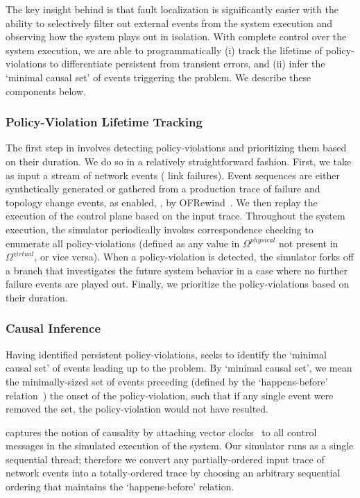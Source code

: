 The key insight behind
\simulator{} is that fault localization is significantly easier with the
ability to selectively filter
out external events from the system execution and observing how the system
plays out in isolation. 
With complete control over the
system execution, we are able to programmatically (i) track the lifetime of
policy-violations to differentiate persistent from transient errors, and (ii)
infer the `minimal causal set' of events triggering the problem. We describe
these components below.

\subsubsection{Policy-Violation Lifetime Tracking} The first step in
\simulator{} involves detecting policy-violations and prioritizing them based
on their duration.
We do so in a relatively straightforward fashion. First, we take as input
a stream of network events (\eg{} link failures). Event sequences are either
synthetically generated or gathered from a production trace of failure and topology change
events, as enabled, \eg{}, by OFRewind~\cite{ofrewind}. We then replay the execution of the
control plane based on the input trace. Throughout the system execution,
the simulator periodically invokes correspondence checking to enumerate all
policy-violations (defined as any value in $\Omega^{physical}$ not present in
$\Omega^{virtual}$, or vice versa). When a policy-violation is detected,
the simulator forks off a branch that investigates the future system behavior
in a case where no further failure events are played out. Finally, we
prioritize the policy-violations based on their duration.

\subsubsection{\bf Causal Inference}  Having identified persistent
policy-violations, \simulator{} seeks to identify the `minimal causal set' of
events leading up to the problem. By `minimal causal set', we mean
the minimally-sized set of events preceding (defined by the `happens-before'
relation~\cite{Lamport:1978:TCO:359545.359563}) the onset of the policy-violation, such that
if any single event were removed the set, the policy-violation would not have resulted.

\Simulator{} captures the notion of causality by attaching vector clocks~\cite{Mattern89virtualtime} to
all control messages in the simulated execution of the system. Our
simulator runs as a single sequential thread; therefore we convert any partially-ordered input trace
of network events into a totally-ordered trace by choosing an arbitrary
sequential ordering that maintains the `happens-before'
relation.

